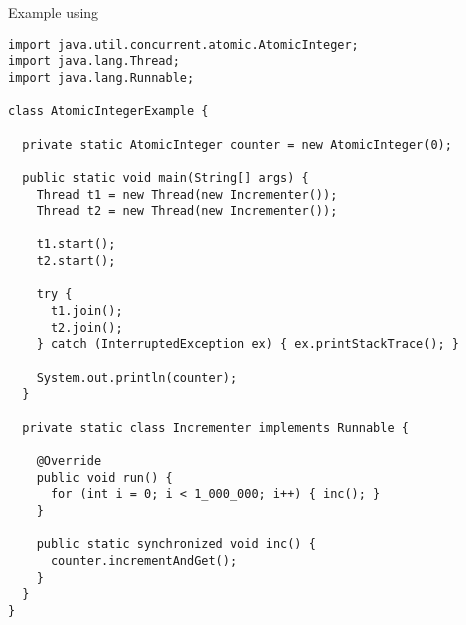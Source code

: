 
\begin{cl}{Example using }
\begin{lstlisting}[language=MyJava]
import java.util.concurrent.atomic.AtomicInteger;
import java.lang.Thread;
import java.lang.Runnable;

class AtomicIntegerExample {

  private static AtomicInteger counter = new AtomicInteger(0);

  public static void main(String[] args) {
    Thread t1 = new Thread(new Incrementer());
    Thread t2 = new Thread(new Incrementer());

    t1.start();
    t2.start();

    try {
      t1.join();
      t2.join();
    } catch (InterruptedException ex) { ex.printStackTrace(); }

    System.out.println(counter);
  }

  private static class Incrementer implements Runnable {

    @Override
    public void run() {
      for (int i = 0; i < 1_000_000; i++) { inc(); }
    }

    public static synchronized void inc() {
      counter.incrementAndGet();
    }
  }
}
\end{lstlisting}
\end{cl}



